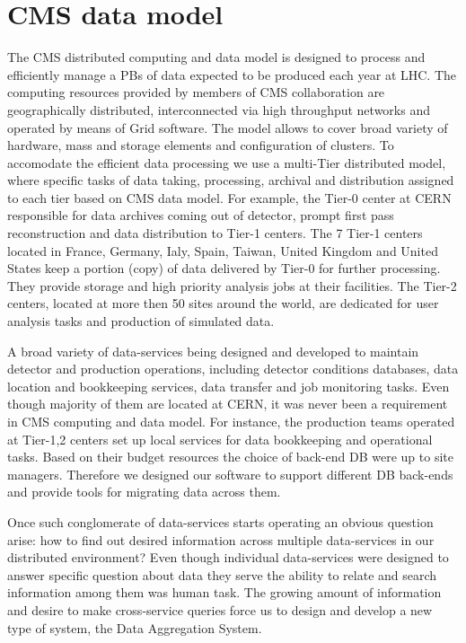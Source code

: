 \documentclass[a4paper]{jpconf}
\begin{document}
\section{CMS data model\label{DataModel}}
The CMS distributed computing and data model \cite{CMSDataModel} 
is designed to process
and efficiently manage a PBs of data expected to be produced each year
at LHC. The computing resources provided by members of CMS
collaboration are geographically distributed, 
interconnected via high throughput networks and operated by means 
of Grid software. The model allows to cover broad variety of
hardware, mass and storage elements and configuration of
clusters. To accomodate the efficient data processing we use 
a multi-Tier distributed model, where specific tasks of data taking,
processing, archival and distribution assigned to each tier based
on CMS data model. For example, the Tier-0 center at CERN responsible
for data archives coming out of detector, prompt first pass reconstruction
and data distribution to Tier-1 centers. The 7 Tier-1 centers
located in France, Germany, Ialy, Spain, Taiwan, United Kingdom and United States
keep a portion (copy) of data delivered by Tier-0 for further processing.
They provide storage and high priority analysis jobs at their facilities.
The Tier-2 centers, located at more then 50 sites around the world,
are dedicated for user analysis tasks and production of simulated data.

A broad variety of data-services being designed and developed to
maintain detector and production operations, including detector
conditions databases, data location and bookkeeping services,
data transfer and job monitoring tasks. Even though majority of them
are located at CERN, it was never been a requirement in CMS computing
and data model. For instance, the production teams operated at Tier-1,2
centers set up local services for data bookkeeping and operational
tasks. Based on their budget resources the choice of back-end DB were
up to site managers. Therefore we designed our software to support different
DB back-ends and provide tools for migrating data across them.

Once such conglomerate of data-services starts operating an obvious
question arise: how to find out desired information across multiple data-services
in our distributed environment? Even though individual data-services were designed
to answer specific question about data they serve the ability to relate and search
information among them was human task. The growing amount of information
and desire to make cross-service queries force us to design and develop a new
type of system, the Data Aggregation System.
\end{document}
